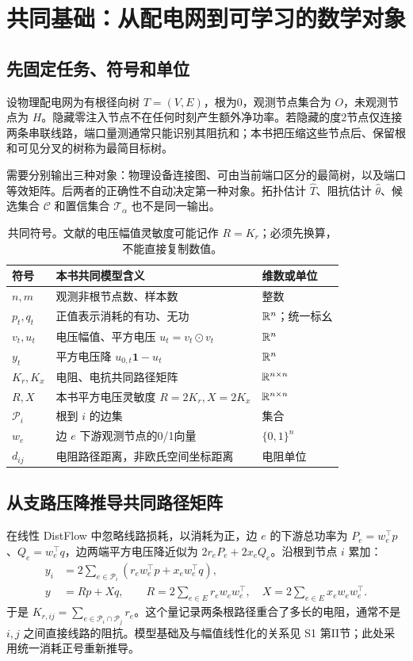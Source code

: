 \chapter{共同基础：从配电网到可学习的数学对象}
\label{ch:foundations}
\section{先固定任务、符号和单位}
\begin{definition}[观测树与目标树]
设物理配电网为有根径向树 $T=(V,E)$，根为0，观测节点集合为 $O$，未观测节点为 $H$。隐藏零注入节点不在任何时刻产生额外净功率。若隐藏的度2节点仅连接两条串联线路，端口量测通常只能识别其阻抗和；本书把压缩这些节点后、保留根和可见分叉的树称为最简目标树。
\end{definition}
需要分别输出三种对象：物理设备连接图、可由当前端口区分的最简树，以及端口等效矩阵。后两者的正确性不自动决定第一种对象。拓扑估计 $\widehat T$、阻抗估计 $\widehat\theta$、候选集合 $\mathcal C$ 和置信集合 $\mathcal T_\alpha$ 也不是同一输出。

\begin{table}[htbp]\centering\small
\begin{tabularx}{\textwidth}{lXl}
\toprule 符号 & 本书共同模型含义 & 维数或单位\\\midrule
$n,m$ & 观测非根节点数、样本数 & 整数\\
$p_t,q_t$ & 正值表示消耗的有功、无功 & $\mathbb{R}^n$；统一标幺\\
$v_t,u_t$ & 电压幅值、平方电压 $u_t=v_t\odot v_t$ & $\mathbb{R}^n$\\
$y_t$ & 平方电压降 $u_{0,t}\mathbf1-u_t$ & $\mathbb{R}^n$\\
$K_r,K_x$ & 电阻、电抗共同路径矩阵 & $\mathbb{R}^{n\times n}$\\
$R,X$ & 本书平方电压灵敏度 $R=2K_r,X=2K_x$ & $\mathbb{R}^{n\times n}$\\
$\mathcal P_i$ & 根到 $i$ 的边集 & 集合\\
$w_e$ & 边 $e$ 下游观测节点的0/1向量 & $\{0,1\}^n$\\
$d_{ij}$ & 电阻路径距离，非欧氏空间坐标距离 & 电阻单位\\
\bottomrule
\end{tabularx}
\caption{共同符号。文献的电压幅值灵敏度可能记作 $R=K_r$；必须先换算，不能直接复制数值。}
\end{table}

\section{从支路压降推导共同路径矩阵}
在线性 DistFlow 中忽略线路损耗，以消耗为正，边 $e$ 的下游总功率为 $P_e=w_e^\top p$、$Q_e=w_e^\top q$，边两端平方电压降近似为 $2r_eP_e+2x_eQ_e$。沿根到节点 $i$ 累加：
\begin{align}
 y_i&=2\sum_{e\in\mathcal P_i}(r_ew_e^\top p+x_ew_e^\top q),\\
 y&=Rp+Xq,\qquad
 R=2\sum_{e\in E}r_ew_ew_e^\top,\quad
 X=2\sum_{e\in E}x_ew_ew_e^\top.\label{eq:tb-base-rx}
\end{align}
于是 $K_{r,ij}=\sum_{e\in\mathcal P_i\cap\mathcal P_j}r_e$。这个量记录两条根路径重合了多长的电阻，通常不是 $i,j$ 之间直接线路的阻抗。模型基础及与幅值线性化的关系见 S1 第II节\citep{S1}；此处采用统一消耗正号重新推导。

